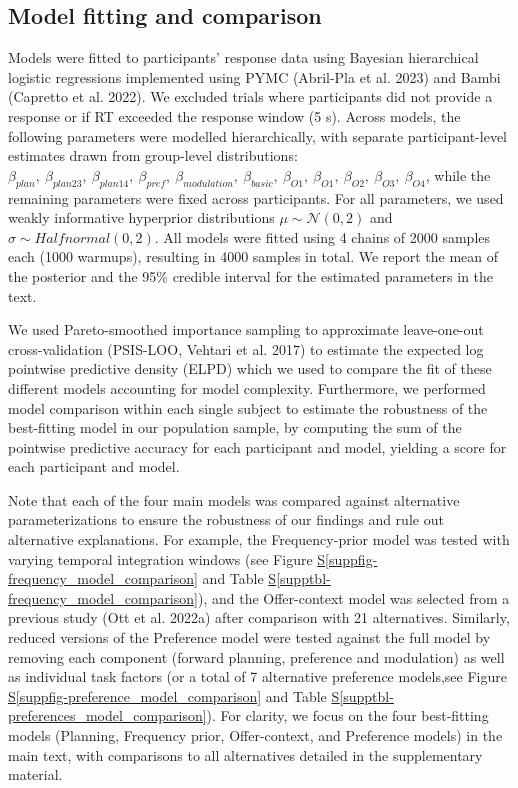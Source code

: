 \documentclass[
  letterpaper,
  DIV=11,
  numbers=noendperiod]{scrartcl}
\newcommand*\quartosuppfigref[1]{Figure \hyperref[#1]{S\ref{#1}}}
\newcommand*\quartosupptblref[1]{Table \hyperref[#1]{S\ref{#1}}}
\begin{document}
\subsection{Model fitting and
comparison}\label{model-fitting-and-comparison}

Models were fitted to participants' response data using Bayesian
hierarchical logistic regressions implemented using PYMC ({Abril-Pla et
al.} 2023) and Bambi (Capretto et al. 2022). We excluded trials where
participants did not provide a response or if RT exceeded the response
window (5 s). Across models, the following parameters were modelled
hierarchically, with separate participant-level estimates drawn from
group-level distributions:
\(\beta_{plan},\ \beta_{plan23},\ \beta_{plan14},\ \beta_{pref},\ \beta_{modulation},\ \beta_{basic},\ \beta_{O1},\ \beta_{O1},\ \beta_{O2},\ \beta_{O3},\ \beta_{O4}\),
while the remaining parameters were fixed across participants. For all
parameters, we used weakly informative hyperprior distributions
\(\mu \sim \mathcal{N}(0, 2)\) and \(\sigma \sim Halfnormal(0, 2)\). All
models were fitted using 4 chains of 2000 samples each (1000 warmups),
resulting in 4000 samples in total. We report the mean of the posterior
and the 95\% credible interval for the estimated parameters in the text.

We used Pareto-smoothed importance sampling to approximate leave-one-out
cross-validation (PSIS-LOO, Vehtari et al. 2017) to estimate the
expected log pointwise predictive density (ELPD) which we used to
compare the fit of these different models accounting for model
complexity. Furthermore, we performed model comparison within each
single subject to estimate the robustness of the best-fitting model in
our population sample, by computing the sum of the pointwise predictive
accuracy for each participant and model, yielding a score for each
participant and model.

Note that each of the four main models was compared against alternative
parameterizations to ensure the robustness of our findings and rule out
alternative explanations. For example, the Frequency-prior model was
tested with varying temporal integration windows (see
\quartosuppfigref{suppfig-frequency_model_comparison} and
\quartosupptblref{supptbl-frequency_model_comparison}), and the
Offer-context model was selected from a previous study (Ott et al.
2022a) after comparison with 21 alternatives. Similarly, reduced
versions of the Preference model were tested against the full model by
removing each component (forward planning, preference and modulation) as
well as individual task factors (or a total of 7 alternative preference
models,see \quartosuppfigref{suppfig-preference_model_comparison} and
\quartosupptblref{supptbl-preferences_model_comparison}). For clarity,
we focus on the four best-fitting models (Planning, Frequency prior,
Offer-context, and Preference models) in the main text, with comparisons
to all alternatives detailed in the supplementary material.
\end{document}
